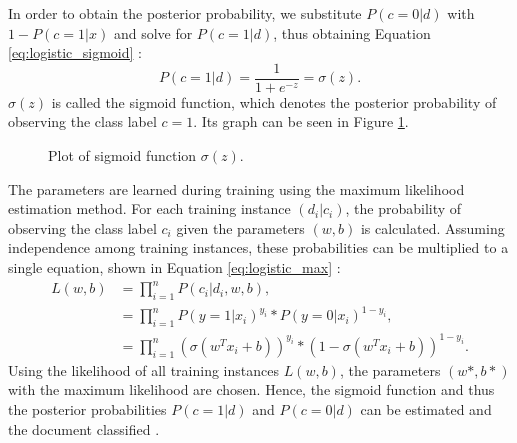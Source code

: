 In order to obtain the posterior probability, we substitute $P(c=0|d)$ with $1 - P(c=1|x)$ and solve for $P(c=1|d)$, thus obtaining Equation \eqref{eq:logistic_sigmoid} \cite{DBLP:books/aw/TanSKK2019}:
        {\begin{equation}
            \label{eq:logistic_sigmoid}
                P(c=1|d) = \frac{1}{1+e^{-z}} = \sigma(z).
        \end{equation}}
$\sigma(z)$ is called the sigmoid function, which denotes the posterior probability of observing the class label $c=1$. Its graph can be seen in Figure \ref{fig:sigmoid}.
        \begin{figure}
        \centering

    \caption{Plot of sigmoid function $\sigma(z)$.}
      \label{fig:sigmoid}
\end{figure}
The parameters are learned during training using the maximum likelihood estimation method. For each training instance $(d_i|c_i)$, the probability of observing the class label $c_i$ given the parameters $(w,b)$ is calculated. Assuming independence among training instances, these probabilities can be multiplied to a single equation, shown in Equation \eqref{eq:logistic_max} \cite{DBLP:books/aw/TanSKK2019}:
        \begin{equation}
        \begin{split}
            \label{eq:logistic_max}
                L(w,b) & = \prod_{i=1}^{n}P(c_i|d_i,w,b), \\
                        & = \prod_{i=1}^{n}P(y=1|x_i)^{y_i} * P(y=0|x_i)^{1-y_i}, \\
                    &    = \prod_{i=1}^{n}(\sigma(w^T x_i + b))^{y_i} * (1 - \sigma(w^T x_i + b))^{1-y_i}.
                        \end{split}
        \end{equation}
Using the likelihood of all training instances $L(w,b)$, the parameters $(w*,b*)$ with the maximum likelihood are chosen. Hence, the sigmoid function and thus the posterior probabilities $P(c=1|d)$ and $P(c=0|d)$ can be estimated and the document classified \cite{DBLP:books/aw/TanSKK2019}.


